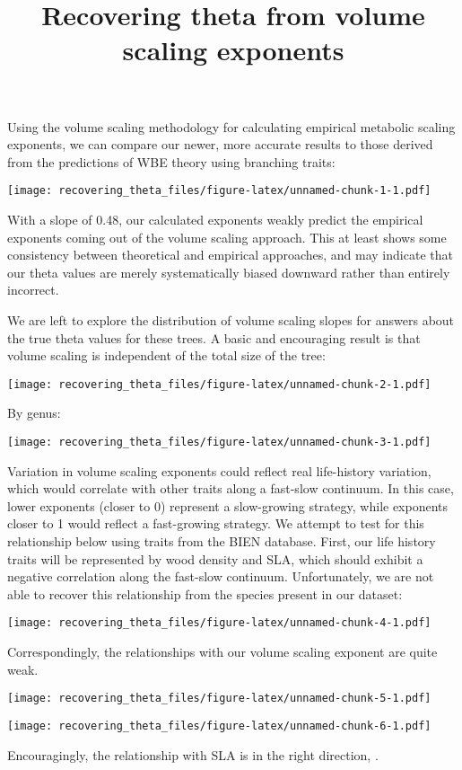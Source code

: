 \documentclass[]{article}
\title{Recovering theta from volume scaling exponents}
\author{}
\date{\vspace{-2.5em}}
\begin{document}
\maketitle

Using the volume scaling methodology for calculating empirical metabolic
scaling exponents, we can compare our newer, more accurate results to
those derived from the predictions of WBE theory using branching traits:

\texttt{[image: recovering\_theta\_files/figure-latex/unnamed-chunk-1-1.pdf]}

With a slope of 0.48, our calculated exponents weakly predict the
empirical exponents coming out of the volume scaling approach. This at
least shows some consistency between theoretical and empirical
approaches, and may indicate that our theta values are merely
systematically biased downward rather than entirely incorrect.

We are left to explore the distribution of volume scaling slopes for
answers about the true theta values for these trees. A basic and
encouraging result is that volume scaling is independent of the total
size of the tree:

\texttt{[image: recovering\_theta\_files/figure-latex/unnamed-chunk-2-1.pdf]}

By genus:

\texttt{[image: recovering\_theta\_files/figure-latex/unnamed-chunk-3-1.pdf]}

Variation in volume scaling exponents could reflect real life-history
variation, which would correlate with other traits along a fast-slow
continuum. In this case, lower exponents (closer to 0) represent a
slow-growing strategy, while exponents closer to 1 would reflect a
fast-growing strategy. We attempt to test for this relationship below
using traits from the BIEN database. First, our life history traits will
be represented by wood density and SLA, which should exhibit a negative
correlation along the fast-slow continuum. Unfortunately, we are not
able to recover this relationship from the species present in our
dataset:

\texttt{[image: recovering\_theta\_files/figure-latex/unnamed-chunk-4-1.pdf]}

Correspondingly, the relationships with our volume scaling exponent are
quite weak.

\texttt{[image: recovering\_theta\_files/figure-latex/unnamed-chunk-5-1.pdf]}

\texttt{[image: recovering\_theta\_files/figure-latex/unnamed-chunk-6-1.pdf]}

Encouragingly, the relationship with SLA is in the right direction, .
\end{document}
